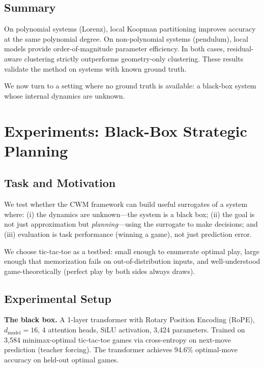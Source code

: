 \documentclass[11pt]{article}
\theoremstyle{definition}
\begin{document}
\subsection{Summary}

On polynomial systems (Lorenz), local Koopman partitioning improves accuracy at the same polynomial degree. On non-polynomial systems (pendulum), local models provide order-of-magnitude parameter efficiency. In both cases, residual-aware clustering strictly outperforms geometry-only clustering. These results validate the method on systems with known ground truth.

We now turn to a setting where no ground truth is available: a black-box system whose internal dynamics are unknown.

\section{Experiments: Black-Box Strategic Planning}\label{sec:planning}

\subsection{Task and Motivation}

We test whether the CWM framework can build useful surrogates of a system where: (i) the dynamics are unknown---the system is a black box; (ii) the goal is not just approximation but \emph{planning}---using the surrogate to make decisions; and (iii) evaluation is task performance (winning a game), not just prediction error.

We choose tic-tac-toe as a testbed: small enough to enumerate optimal play, large enough that memorization fails on out-of-distribution inputs, and well-understood game-theoretically (perfect play by both sides always draws).

\subsection{Experimental Setup}

\textbf{The black box.} A 1-layer transformer with Rotary Position Encoding (RoPE), $d_\text{model}=16$, 4 attention heads, SiLU activation, 3,424 parameters. Trained on 3,584 minimax-optimal tic-tac-toe games via cross-entropy on next-move prediction (teacher forcing). The transformer achieves 94.6\% optimal-move accuracy on held-out optimal games.
\end{document}
